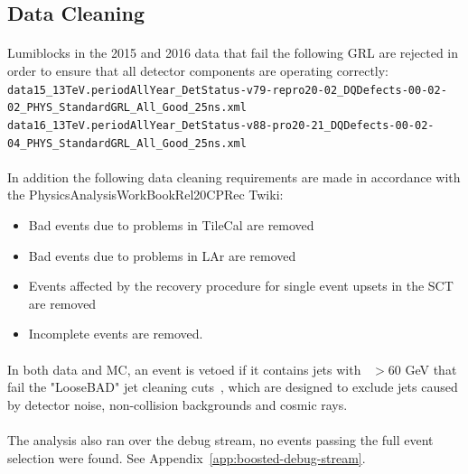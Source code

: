 \subsection{Data Cleaning}
\label{sec:cleaning}
\paragraph{}
Lumiblocks in the 2015 and 2016 data that fail the following GRL are rejected in order to ensure that all detector components are operating correctly:
\\ 
\noindent
{ \scriptsize
\verb|data15_13TeV.periodAllYear_DetStatus-v79-repro20-02_DQDefects-00-02-02_PHYS_StandardGRL_All_Good_25ns.xml|\\
\verb|data16_13TeV.periodAllYear_DetStatus-v88-pro20-21_DQDefects-00-02-04_PHYS_StandardGRL_All_Good_25ns.xml|
}
\paragraph{}
In addition the following data cleaning requirements are made in accordance with the PhysicsAnalysisWorkBookRel20CPRec Twiki\cite{DataCleaning}:
\begin{itemize}
\item Bad events due to problems in TileCal are removed 
\item Bad events due to problems in LAr are removed
\item Events affected by the recovery procedure for single event upsets in the SCT are removed
\item Incomplete events are removed.
\end{itemize}

\paragraph{}
In both data and MC, an event is vetoed if it contains jets with \pt~$>$60 GeV that fail the "LooseBAD" jet cleaning cuts~\cite{JetCleaning2016}, which are designed to exclude jets caused by detector noise, non-collision backgrounds and cosmic rays. 

\paragraph{}
The analysis also ran over the debug stream, no events passing the full event selection were found. See Appendix~\ref{app:boosted-debug-stream}.


